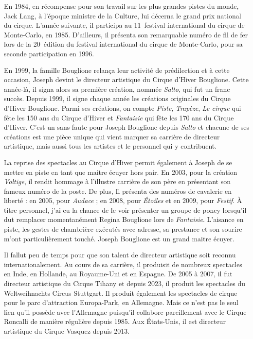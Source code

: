 En 1984, en récompense pour son travail sur les plus grandes pistes du monde, Jack Lang, à l’époque ministre de la Culture, lui décerna le grand prix national du cirque. L’année suivante, il participa au 11\ieme~festival international du cirque de Monte-Carlo, en 1985. D’ailleurs, il présenta son remarquable numéro de fil de fer lors de la 20\ieme~édition du festival international du cirque de Monte-Carlo, pour sa seconde participation en 1996.

En 1999, la famille Bouglione relança leur activité de prédilection et à cette occasion, Joseph devint le directeur artistique du Cirque d'Hiver Bouglione. Cette année-là, il signa alors sa première création, nommée \textit{Salto}, qui fut un franc succès. Depuis 1999, il signe chaque année les créations originales du Cirque d’Hiver Bouglione. Parmi ses créations, on compte \textit{Piste}, \textit{Trapèze}, \textit{Le cirque} qui fête les 150 ans du Cirque d'Hiver et \textit{Fantaisie} qui fête les 170 ans du Cirque d’Hiver. C’est un sans-faute pour Joseph Bouglione depuis \textit{Salto} et chacune de ses créations est une pièce unique qui vient marquer sa carrière de directeur artistique, mais aussi tous les artistes et le personnel qui y contribuent.

La reprise des spectacles au Cirque d’Hiver permit également à Joseph de se mettre en piste en tant que maitre écuyer hors pair. En 2003, pour la création \textit{Voltige}, il rendit hommage à l’illustre carrière de son père en présentant son fameux numéro de la poste. De plus, Il présenta des numéros de cavalerie en liberté : en 2005, pour \textit{Audace} ; en 2008, pour \textit{Étoiles} et en 2009, pour \textit{Festif}. À titre personnel, j’ai eu la chance de le voir présenter un groupe de poney lorsqu’il dut remplacer momentanément Regina Bouglione lors de \textit{Fantaisie}. L’aisance en piste, les gestes de chambrière exécutés avec adresse, sa prestance et son sourire m’ont particulièrement touché. Joseph Bouglione est un grand maitre écuyer.

Il fallut peu de temps pour que son talent de directeur artistique soit reconnu internationalement. Au cours de sa carrière, il produisit de nombreux spectacles en Inde, en Hollande, au Royaume-Uni et en Espagne. De 2005 à 2007, il fut directeur artistique du Cirque Tihany et depuis 2023, il produit les spectacles du Weltweihnachts Circus Stuttgart. Il produit également les spectacles de cirque pour le parc d'attraction Europa-Park, en Allemagne. Mais ce n’est pas le seul lien qu’il possède avec l’Allemagne puisqu’il collabore pareillement avec le Cirque Roncalli de manière régulière depuis 1985. Aux États-Unis, il est directeur artistique du Cirque Vasquez depuis 2013.

